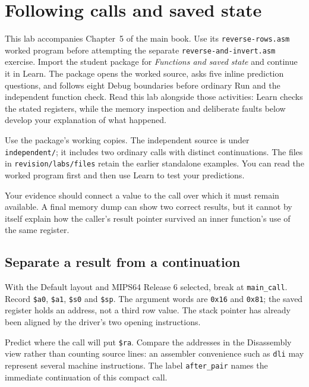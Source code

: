 \chapter{Following calls and saved state}
\label{revision:lab-functions}

This lab accompanies Chapter~5 of the main book. Use its
\texttt{reverse-rows.asm} worked program before attempting the separate
\texttt{reverse-and-invert.asm} exercise. Import the student package for
\emph{Functions and saved state} and continue it in Learn. The package opens the
worked source, asks five inline prediction questions, and follows eight Debug
boundaries before ordinary Run and the independent function check. Read this lab
alongside those activities: Learn checks the stated registers, while the memory
inspection and deliberate faults below develop your explanation of what happened.

Use the package's working copies. The independent source is under
\texttt{independent/}; it includes two ordinary calls with distinct continuations.
The files in \texttt{revision/labs/files} retain the earlier standalone examples.
You can read the worked program first and then use Learn to test your predictions.

Your evidence should connect a value to the call over which it must remain
available. A final memory dump can show two correct results, but it cannot by
itself explain how the caller's result pointer survived an inner function's use
of the same register.

\section{Separate a result from a continuation}

With the Default layout and MIPS64 Release 6 selected, break at
\texttt{main\_call}. Record \texttt{\$a0}, \texttt{\$a1}, \texttt{\$s0} and
\texttt{\$sp}. The argument words are \texttt{0x16} and \texttt{0x81}; the saved
register holds an address, not a third row value. The stack pointer has already
been aligned by the driver's two opening instructions.

Predict where the call will put \texttt{\$ra}. Compare the addresses in the
Disassembly view rather than counting source lines: an assembler convenience
such as \texttt{dli} may represent several machine instructions. The label
\texttt{after\_pair} names the immediate continuation of this compact call.

